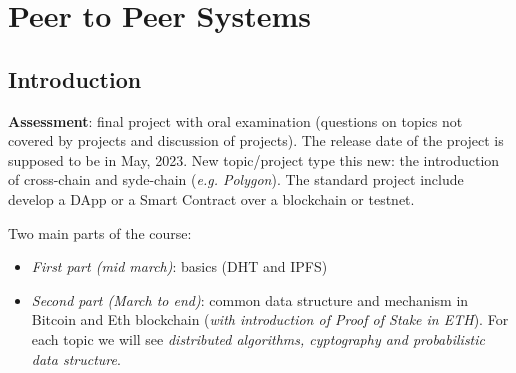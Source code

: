 \documentclass[10pt,a4paper]{report}
\begin{document}
\clearpage
%

\tableofcontents

\chapter{Peer to Peer Systems}


\section{Introduction}
\iffalse
\label{sec:introduction}
\textbf{Assessment}: final project with oral examination (questions on topics not covered by projects and discussion of projects). The release date of the project is supposed to be in May, 2023.
New topic/project type this new: the introduction of cross-chain and syde-chain (\textit{e.g. Polygon}). The standard project include develop a DApp or a Smart Contract over a blockchain or testnet.

Two main parts of the course:
\begin{itemize}
	\item 
	\textit{First part (mid march)}: basics (DHT and IPFS)
	\item 
	\textit{Second part (March to end)}: common data structure and mechanism in Bitcoin and Eth blockchain (\textit{with introduction of Proof of Stake in ETH}). For each topic we will see \textit{distributed algorithms, cyptography and probabilistic data structure}.
\end{itemize}
\end{document}
